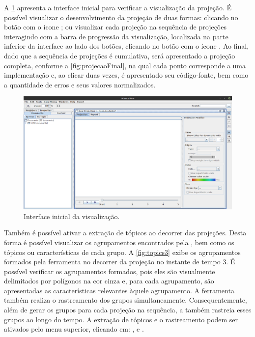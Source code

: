 		
		A \cref{fig:projecao} apresenta a interface inicial para verificar a visualização da
		projeção. É possível visualizar o desenvolvimento da projeção de duas formas: clicando no botão
		com o ícone ; ou visualizar cada projeção na sequência de projeções
		interagindo com a barra de progressão da visualização, localizada na parte inferior
		da interface ao lado dos botões, clicando no botão com o ícone .
		Ao final, dado que a sequência de projeções é cumulativa, será apresentado a projeção
		completa, conforme a \cref{fig:projecaoFinal}, na qual cada ponto corresponde a uma
		implementação e, ao clicar duas vezes, é apresentado seu código-fonte, bem como a
		quantidade de erros e seus valores normalizados.
		
		\begin{figure}
			\centering
			\includegraphics[width=1\linewidth]{imagem/projecao}
			\caption{Interface inicial da visualização.}
			\label{fig:projecao}
		\end{figure}
		
		Também é possível ativar a extração de tópicos ao decorrer das projeções. Desta
		forma é possível visualizar os agrupamentos encontrados pela ,
		bem como os tópicos ou características de cada grupo. A \cref{fig:topics3}
		exibe os agrupamentos formados pela ferramenta no decorrer da projeção no instante
		de tempo $3$. É possível verificar os agrupamentos formados, pois eles são
		visualmente delimitados por polígonos  na cor cinza e, para cada agrupamento,
		são apresentadas as características relevantes àquele agrupamento. A ferramenta
		também realiza o rastreamento dos grupos simultaneamente. Consequentemente, além
		de gerar os grupos para cada projeção na sequência, a 
		também rastreia esses grupos ao longo do tempo. A extração de tópicos e o
		rastreamento podem ser ativados pelo menu superior, clicando em:
		,  e .
		

